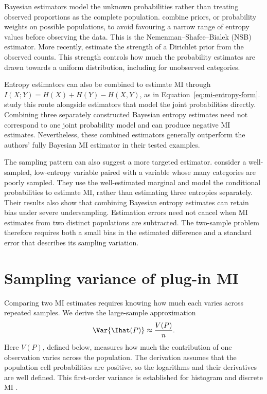 Bayesian estimators model the unknown probabilities rather than treating
observed proportions as the complete population.
\citet{nemenman2002} combine priors, or probability weights on possible
populations, to avoid favouring a narrow range of entropy values before
observing the data. This is the Nemenman--Shafee--Bialek (NSB) estimator.
More recently, \citet{piga2024} estimate the strength of a Dirichlet prior
from the observed counts. This strength controls how much the probability
estimates are drawn towards a uniform distribution, including for
unobserved categories.

Entropy estimators can also be combined to estimate MI through
\(I(X;Y)=H(X)+H(Y)-H(X,Y)\), as in
Equation~\eqref{eq:mi-entropy-form}. \citet{archer2013} study this route
alongside estimators that model the joint probabilities directly. Combining
three separately constructed Bayesian entropy estimates need not correspond
to one joint probability model and can produce negative MI estimates.
Nevertheless, these combined estimators generally outperform the authors'
fully Bayesian MI estimator in their tested examples.

The sampling pattern can also suggest a more targeted estimator.
\citet{hernandez2019} consider a well-sampled, low-entropy variable paired
with a variable whose many categories are poorly sampled. They use the
well-estimated marginal and model the conditional probabilities to estimate
MI, rather than estimating three entropies separately. Their results also
show that combining Bayesian entropy estimates can retain bias under severe
undersampling. Estimation errors need not cancel when MI estimates from
two distinct populations are subtracted. The two-sample problem therefore
requires both a small bias in the estimated difference and a standard error
that describes its sampling variation.

\allowdisplaybreaks[0]
\section{Sampling variance of plug-in MI}
\label{sec:first-order-mi-background}

Comparing two MI estimates requires knowing how much each varies across
repeated samples. We derive the large-sample approximation
\begin{equation}
  \Var\{\Ihat(P)\}\approx\frac{V(P)}{n}.
  \label{eq:first-order-mi-var-background}
\end{equation}
Here \(V(P)\), defined below, measures how much the contribution of one
observation varies across the population. The derivation assumes that the
population cell probabilities are positive, so the logarithms and their
derivatives are well defined. This first-order variance is established for
histogram and discrete MI \citep{moddemeijer1989,brillinger2004}.

